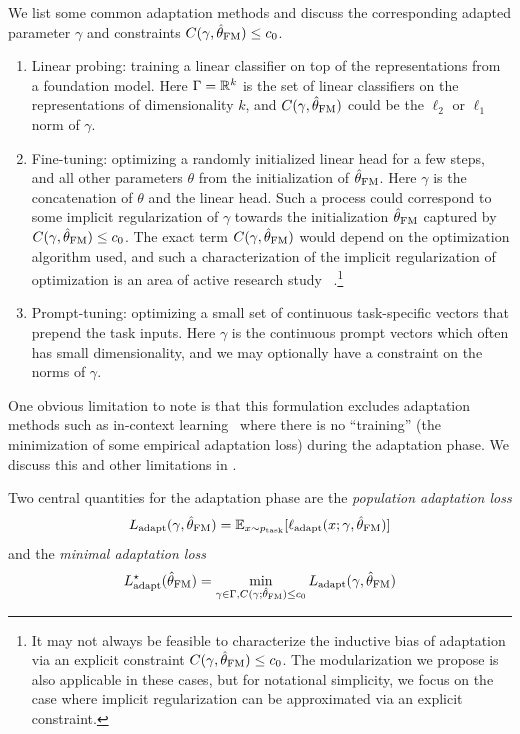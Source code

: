 We list some common adaptation methods and discuss the corresponding adapted parameter $\gamma$ and constraints $C(\gamma, \hat{\theta}_{\textup{FM}})\leq c_0$. 
\begin{enumerate}
    \item Linear probing: training a linear classifier on top of the representations from a foundation model. Here $\Gamma = \mathbb{R}^k$ is the set of linear classifiers on the representations of dimensionality $k$, and $C(\gamma, \hat{\theta}_{\textup{FM}})$ could be the $\ell_2$ or $\ell_1$ norm of $\gamma$. 
    \item Fine-tuning: optimizing a randomly initialized linear head for a few steps, and all other parameters $\theta$ from the initialization of $\hat{\theta}_{\textup{FM}}$. Here $\gamma$ is the concatenation of $\theta$ and the linear head. Such a process could correspond to some implicit regularization of $\gamma$ towards the initialization $\hat{\theta}_{\textup{FM}}$ captured by $C(\gamma, \hat{\theta}_{\textup{FM}}) \leq c_0$. The exact term $C(\gamma, \hat{\theta}_{\textup{FM}})$ would depend on the optimization algorithm used, and such a characterization of the implicit regularization of optimization is an area of active research study ~\citep[\eg][and references therein]{gunasekar2017implicit, soudry2018implicit,gunasekar2018implicit,arora2019implicit, blanc2019implicit,woodworth2020kernel, wei2020implicit, haochen2021shape,damian2021label}.\footnote{
    It may not always be feasible to characterize the inductive bias of adaptation via an explicit constraint $C(\gamma,\hat{\theta}_{\textup{FM}})\leq c_0$. The modularization we propose is also applicable in these cases, but for notational simplicity, we focus on the case where implicit regularization can be approximated via an explicit constraint.
    }
    \item Prompt-tuning: optimizing a small set of continuous task-specific vectors that prepend the task inputs. Here $\gamma$ is the continuous prompt vectors which often has small dimensionality, and we may optionally have a constraint on the norms of $\gamma$. 
\end{enumerate}

One obvious limitation to note is that this formulation excludes adaptation methods such as in-context learning~\citep{brown2020gpt3} where there is no ``training'' (\ie the minimization of some empirical adaptation loss) during the adaptation phase. We discuss this and other limitations in . 

Two central quantities for the adaptation phase are the \textit{population adaptation loss}
\begin{align}
    L_{\text{adapt}}(\gamma, \hat{\theta}_{\textup{FM}}) = \mathbb{E}_{x\sim p_{\text{task}}}[ \ell_{\text{adapt}}(x; \gamma,\hat{\theta}_{\textup{FM}})]
\end{align}
and the \emph{minimal adaptation loss} 
\begin{align}
    L_{\text{adapt}}^\star(\hat{\theta}_{\textup{FM}}) = \min_{\gamma \in \Gamma, C(\gamma;\hat{\theta}_{\textup{FM}})\le c_0}L_{\text{adapt}}(\gamma, \hat{\theta}_{\textup{FM}})
    \label{eqn:5}
\end{align}

